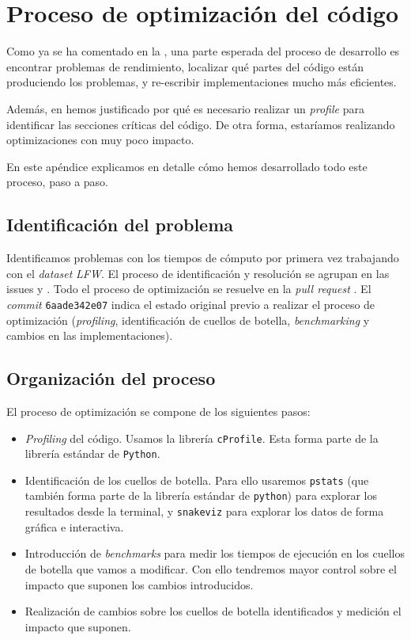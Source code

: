 \chapter{Proceso de optimización del código}  \label{apendice:optimizacion_codigo}

Como ya se ha comentado en la , una parte esperada del proceso de desarrollo es encontrar problemas de rendimiento, localizar qué partes del código están produciendo los problemas, y re-escribir implementaciones mucho más eficientes.

Además, en  hemos justificado por qué es necesario realizar un \textit{profile} para identificar las secciones críticas del código. De otra forma, estaríamos realizando optimizaciones con muy poco impacto.

En este apéndice explicamos en detalle cómo hemos desarrollado todo este proceso, paso a paso.

\section{Identificación del problema}

Identificamos problemas con los tiempos de cómputo por primera vez trabajando con el \textit{dataset} \textit{LFW}. El proceso de identificación y resolución se agrupan en las issues \cite{informatica:issue35_profiling} y \cite{informatica:issue36_slowmetrics}. Todo el proceso de optimización se resuelve en la \textit{pull request} \cite{informatica:pr42_profiling}. El \textit{commit} \lstinline{6aade342e07} \cite{informatica:commit_base_optimizacion} indica el estado original previo a realizar el proceso de optimización (\textit{profiling}, identificación de cuellos de botella, \textit{benchmarking} y cambios en las implementaciones).

\section{Organización del proceso}

El proceso de optimización se compone de los siguientes pasos:

\begin{itemize}
	\item \textit{Profiling} del código. Usamos la librería \lstinline{cProfile}. Esta forma parte de la librería estándar de \lstinline{Python}.
	\item Identificación de los cuellos de botella. Para ello usaremos \lstinline{pstats} (que también forma parte de la librería estándar de \lstinline{python}) para explorar los resultados desde la terminal, y \lstinline{snakeviz} para explorar los datos de forma gráfica e interactiva.
	\item Introducción de \textit{benchmarks} para medir los tiempos de ejecución en los cuellos de botella que vamos a modificar. Con ello tendremos mayor control sobre el impacto que suponen los cambios introducidos.
	\item Realización de cambios sobre los cuellos de botella identificados y medición el impacto que suponen.
\end{itemize}

